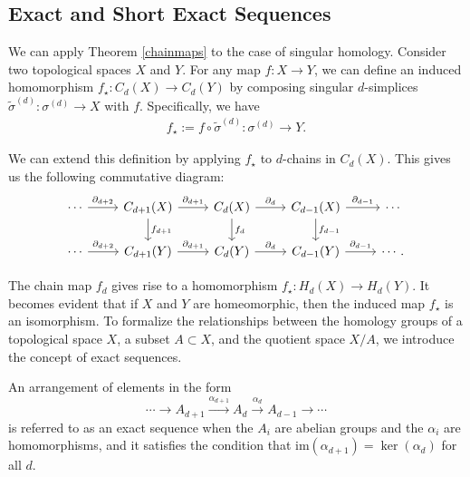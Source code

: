 \subsection{Exact and Short Exact Sequences}
\label{ExactandShortExactSequences}
We can apply Theorem \ref{chainmaps} to the case of singular homology. Consider two topological spaces \( X \) and \( Y \). For any map \( f: X \rightarrow Y \), we can define an induced homomorphism \( f_{\star}: C_{d}(X) \rightarrow C_{d}(Y) \) by composing singular \( d \)-simplices \( \tilde{\sigma}^{(d)}: \sigma^{(d)} \rightarrow X \) with \( f \). Specifically, we have
\begin{align}
	f_{\star} := f \circ \tilde{\sigma}^{(d)}: \sigma^{(d)} \rightarrow Y. 
\end{align}

We can extend this definition by applying \( f_{\star} \) to \( d \)-chains in \( C_{d}(X) \). This gives us the following commutative diagram:
\begin{equation}
	\begin{tikzcd}
		\cdots \arrow[r, "\partial_{d+2}"] & C_{d+1}(X) \arrow[r, "\partial_{d+1}"] \arrow[d, "f_{d+1}"] & C_d(X) \arrow[r, "\partial_d"] \arrow[d, "f_d"] & C_{d-1}(X) \arrow[r, "\partial_{d-1}"] \arrow[d, "f_{d-1}"] & \cdots \\ 
		\cdots \arrow[r, "\partial_{d+2}"] & C_{d+1}(Y) \arrow[r, "\partial_{d+1}"] & C_d(Y) \arrow[r, "\partial_d"] & C_{d-1}(Y) \arrow[r, "\partial_{d-1}"] & \cdots.
	\end{tikzcd}
\end{equation}

The chain map \( f_{d} \) gives rise to a homomorphism \( f_{\star}: H_{d}(X) \rightarrow H_{d}(Y) \). It becomes evident that if \( X \) and \( Y \) are homeomorphic, then the induced map \( f_{\star} \) is an isomorphism. To formalize the relationships between the homology groups of a topological space \( X \), a subset \( A \subset X \), and the quotient space \( X/A \), we introduce the concept of exact sequences.

\begin{definition}
	An arrangement of elements in the form
	\begin{equation}
		\cdots \rightarrow A_{d+1}\xrightarrow{\alpha_{d+1}}A_{d}\xrightarrow{\alpha_d} A_{d-1}\xrightarrow{}\cdots
	\end{equation}
	is referred to as an exact sequence when the \( A_{i} \) are abelian groups and the \( \alpha_{i} \) are homomorphisms, and it satisfies the condition that \( \mathrm{im}(\alpha_{d+1}) = \ker(\alpha_{d})\) for all \( d \).
\end{definition}

